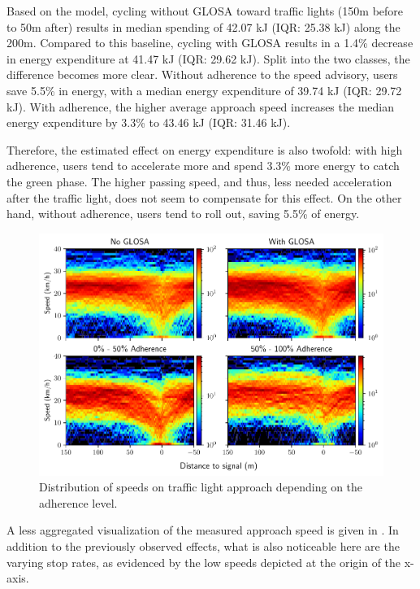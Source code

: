Based on the model, cycling without GLOSA toward traffic lights (150m before to 50m after) results in median spending of 42.07 kJ (IQR: 25.38 kJ) along the 200m. Compared to this baseline, cycling with GLOSA results in a 1.4\% decrease in energy expenditure at 41.47 kJ (IQR: 29.62 kJ). Split into the two classes, the difference becomes more clear. Without adherence to the speed advisory, users save 5.5\% in energy, with a median energy expenditure of 39.74 kJ (IQR: 29.72 kJ). With adherence, the higher average approach speed increases the median energy expenditure by 3.3\% to 43.46 kJ (IQR: 31.46 kJ). 

Therefore, the estimated effect on energy expenditure is also twofold: with high adherence, users tend to accelerate more and spend 3.3\% more energy to catch the green phase. The higher passing speed, and thus, less needed acceleration after the traffic light, does not seem to compensate for this effect. On the other hand, without adherence, users tend to roll out, saving 5.5\% of energy.

\begin{figure}[t]
\caption{Distribution of speeds on traffic light approach depending on the adherence level.}\label{fig:impacts-approach-speed-heatmap}
\includegraphics[width=\linewidth]{images/impacts-approach-speed-heatmap.pdf}
\end{figure}

A less aggregated visualization of the measured approach speed is given in . In addition to the previously observed effects, what is also noticeable here are the varying stop rates, as evidenced by the low speeds depicted at the origin of the x-axis. 

